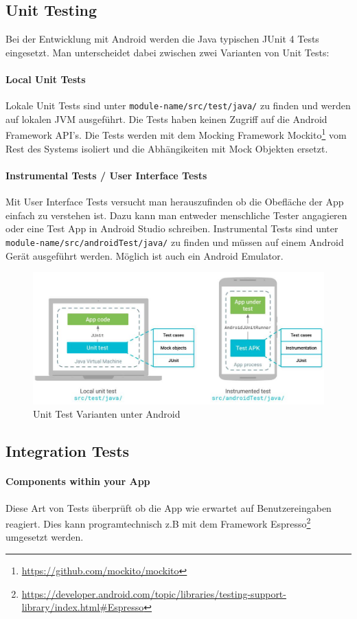\subsection{Unit Testing}
Bei der Entwicklung mit Android werden die Java typischen JUnit 4 Tests eingesetzt. Man unterscheidet dabei zwischen zwei Varianten von Unit Tests:

\paragraph{Local Unit Tests}
Lokale Unit Tests sind unter \lstinline|module-name/src/test/java/| zu finden und werden auf lokalen JVM ausgeführt. Die Tests haben keinen Zugriff auf die Android Framework API's. Die Tests werden mit dem Mocking Framework Mockito\footnote{\url{https://github.com/mockito/mockito}} vom Rest des Systems isoliert und die Abhängikeiten mit Mock Objekten ersetzt.

\paragraph{Instrumental Tests / User Interface Tests}
Mit User Interface Tests versucht man herauszufinden ob die Obefläche der App einfach zu verstehen ist. Dazu kann man entweder menschliche Tester angagieren oder eine Test App in Android Studio schreiben. Instrumental Tests sind unter \lstinline|module-name/src/androidTest/java/| zu finden und müssen auf einem Android Gerät ausgeführt werden. Möglich ist auch ein Android Emulator.

\begin{figure}[h]
\centering
\includegraphics[width=0.7\linewidth]{images/unit_tests}
\caption{Unit Test Varianten unter Android}
\label{fig:unittests}
\end{figure}

\subsection{Integration Tests}

\paragraph{Components within your App}
Diese Art von Tests überprüft ob die App wie erwartet auf Benutzereingaben reagiert. Dies kann programtechnisch z.B mit dem Framework Espresso\footnote{\url{https://developer.android.com/topic/libraries/testing-support-library/index.html\#Espresso}} umgesetzt werden.

